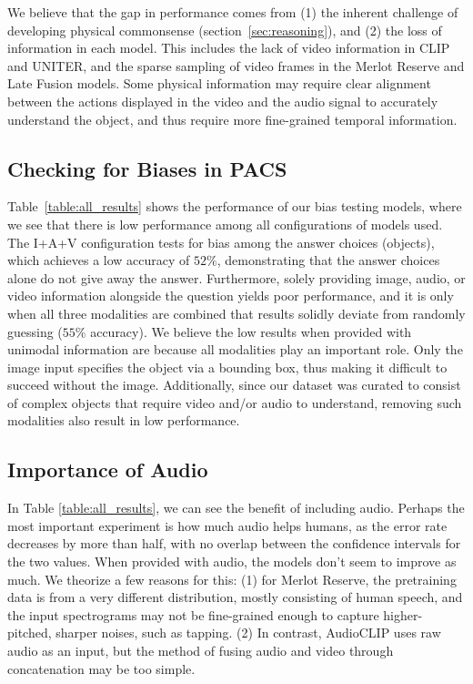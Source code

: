 \documentclass[runningheads]{llncs}
\newcommand{\names}{\textsc{PACS}}
\begin{document}
We believe that the gap in performance comes from (1) the inherent challenge of developing physical commonsense (section~\ref{sec:reasoning}), and (2) the loss of information in each model. This includes the lack of video information in CLIP and UNITER, and the sparse sampling of video frames in the Merlot Reserve and Late Fusion models.
Some physical information may require clear alignment between the actions displayed in the video and the audio signal to accurately understand the object, and thus require more fine-grained temporal information.


\subsection{Checking for Biases in \names}


Table~\ref{table:all_results} shows the performance of our bias testing models, where we see that there is low performance among all configurations of models used. The I+A+V configuration tests for bias among the answer choices (objects), which achieves a low accuracy of $52\%$, demonstrating that the answer choices alone do not give away the answer. Furthermore, solely providing image, audio, or video information alongside the question yields poor performance, and it is only when all three modalities are combined that results solidly deviate from randomly guessing ($55\%$ accuracy).
We believe the low results when provided with unimodal information are because all modalities play an important role. Only the image input specifies the object via a bounding box, thus making it difficult to succeed without the image. Additionally, since our dataset was curated to consist of complex objects that require video and/or audio to understand, removing such modalities also result in low performance.

\subsection{Importance of Audio}
\label{sec:audio_analysis}


In Table \ref{table:all_results}, we can see the benefit of including audio. Perhaps the most important experiment is how much audio helps humans, as the error rate decreases by more than half, with no overlap between the confidence intervals for the two values.
When provided with audio, the models don't seem to improve as much. We theorize a few reasons for this: (1) for Merlot Reserve, the pretraining data is from a very different distribution, mostly consisting of human speech, and the input spectrograms may not be fine-grained enough to capture higher-pitched, sharper noises, such as tapping.
(2) In contrast, AudioCLIP uses raw audio as an input, but the method of fusing audio and video through concatenation may be too simple.
\end{document}
